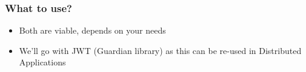 \begin{frame}
    \frametitle{What to use?}

    \begin{itemize}
        \item Both are viable, depends on your needs
        \item We'll go with JWT (Guardian library) as this can be re-used in Distributed Applications
    \end{itemize}
\end{frame}

